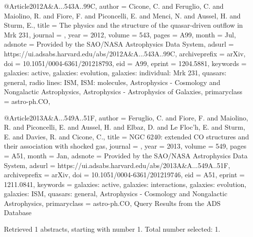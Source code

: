 \documentclass[longauth]{aa}
\begin{document}
{{{{@Article{2012A&A...543A..99C,
  author        = {{Cicone}, C. and {Feruglio}, C. and {Maiolino}, R. and {Fiore}, F. and {Piconcelli}, E. and {Menci}, N. and {Aussel}, H. and {Sturm}, E.},
  title         = {The physics and the structure of the quasar-driven outflow in Mrk 231},
  journal       = {\aap},
  year          = {2012},
  volume        = {543},
  pages         = {A99},
  month         = {Jul},
  adsnote       = {Provided by the SAO/NASA Astrophysics Data System},
  adsurl        = {https://ui.adsabs.harvard.edu/abs/2012A&A...543A..99C},
  archiveprefix = {arXiv},
  doi           = {10.1051/0004-6361/201218793},
  eid           = {A99},
  eprint        = {1204.5881},
  keywords      = {galaxies: active, galaxies: evolution, galaxies: individual: Mrk 231, quasars: general, radio lines: ISM, ISM: molecules, Astrophysics - Cosmology and Nongalactic Astrophysics, Astrophysics - Astrophysics of Galaxies},
  primaryclass  = {astro-ph.CO},
}

@Article{2013A&A...549A..51F,
  author        = {{Feruglio}, C. and {Fiore}, F. and {Maiolino}, R. and {Piconcelli}, E. and {Aussel}, H. and {Elbaz}, D. and {Le Floc'h}, E. and {Sturm}, E. and {Davies}, R. and {Cicone}, C.},
  title         = {NGC 6240: extended CO structures and their association with shocked gas},
  journal       = {\aap},
  year          = {2013},
  volume        = {549},
  pages         = {A51},
  month         = {Jan},
  adsnote       = {Provided by the SAO/NASA Astrophysics Data System},
  adsurl        = {https://ui.adsabs.harvard.edu/abs/2013A&A...549A..51F},
  archiveprefix = {arXiv},
  doi           = {10.1051/0004-6361/201219746},
  eid           = {A51},
  eprint        = {1211.0841},
  keywords      = {galaxies: active, galaxies: interactions, galaxies: evolution, galaxies: ISM, quasars: general, Astrophysics - Cosmology and Nongalactic Astrophysics},
  primaryclass  = {astro-ph.CO},
}
Query Results from the ADS Database


Retrieved 1 abstracts, starting with number 1.  Total number selected: 1.

}}}}
\end{document}
